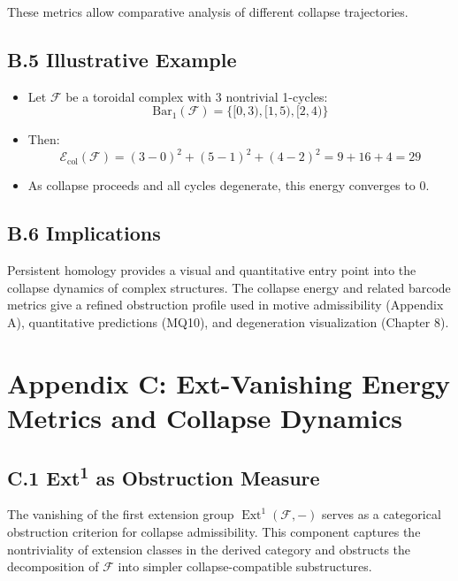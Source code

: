 \documentclass[11pt]{article}
\DeclareMathOperator{\Ext}{Ext}
\begin{document}
These metrics allow comparative analysis of different collapse trajectories.

\subsection*{B.5 Illustrative Example}

\begin{itemize}
    \item Let $\mathcal{F}$ be a toroidal complex with 3 nontrivial 1-cycles:
    \[
    \mathrm{Bar}_1(\mathcal{F}) = \{ [0, 3), [1, 5), [2, 4) \}
    \]
    \item Then:
    \[
    \mathcal{E}_{\mathrm{col}}(\mathcal{F}) = (3-0)^2 + (5-1)^2 + (4-2)^2 = 9 + 16 + 4 = 29
    \]
    \item As collapse proceeds and all cycles degenerate, this energy converges to 0.
\end{itemize}

\subsection*{B.6 Implications}

Persistent homology provides a visual and quantitative entry point into the collapse dynamics of complex structures. The collapse energy and related barcode metrics give a refined obstruction profile used in motive admissibility (Appendix A), quantitative predictions (MQ10), and degeneration visualization (Chapter 8).

\FloatBarrier



\section*{Appendix C: Ext-Vanishing Energy Metrics and Collapse Dynamics}

\subsection*{C.1 Ext\textsuperscript{1} as Obstruction Measure}

The vanishing of the first extension group $\Ext^1(\mathcal{F}, -)$ serves as a categorical obstruction criterion for collapse admissibility. This component captures the nontriviality of extension classes in the derived category and obstructs the decomposition of $\mathcal{F}$ into simpler collapse-compatible substructures.
\end{document}
